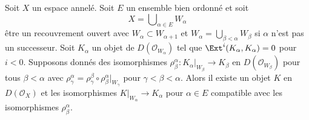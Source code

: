 \begin{lemma}

\label{lemma-glueing-increasing-union}

Soit $X$ un espace annelé. Soit $E$ un ensemble bien ordonné et soit
$$
X = \bigcup\nolimits_{\alpha \in E} W_\alpha
$$
être un recouvrement ouvert avec $W_\alpha \subset W_{\alpha + 1}$
et $W_\alpha = \bigcup_{\beta < \alpha} W_\beta$ si $\alpha$ n'est pas un successeur. Soit $K_\alpha$ un objet de $D(\mathcal{O}_{W_\alpha})$
tel que $\Ext^i(K_\alpha, K_\alpha) = 0$ pour $i < 0$. Supposons donnés des isomorphismes
$\rho_\beta^\alpha :  K_\alpha|_{W_\beta} \to K_\beta$ en
$D(\mathcal{O}_{W_\beta})$ pour tous $\beta < \alpha$ avec
$\rho_\gamma^\alpha = \rho_\gamma^\beta \circ \rho^\alpha_\beta|_{W_\gamma}$
pour $\gamma < \beta < \alpha$. Alors il existe un objet
$K$ en $D(\mathcal{O}_X)$ et les isomorphismes
$K|_{W_\alpha} \to K_\alpha$ pour $\alpha \in E$
compatible avec les isomorphismes $\rho_\beta^\alpha$.

\end{lemma}

